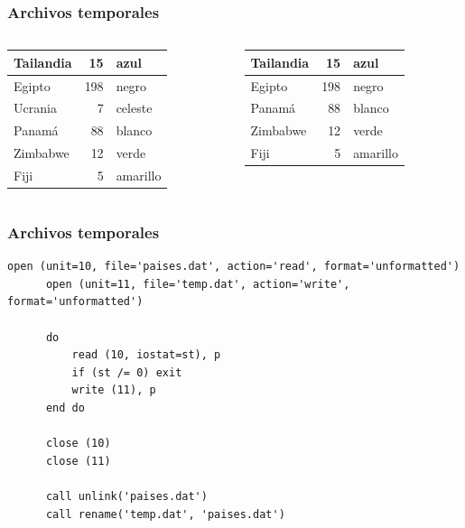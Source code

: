 \documentclass[12pt]{beamer}
\begin{document}
  \begin{frame}
    \frametitle{Archivos temporales}
    \begin{columns}[t]
        \vspace{2ex}
        \begin{tabular}{|l|r|l|}\hline
          Tailandia &  15 & azul     \\\hline
          Egipto    & 198 & negro    \\\hline
          Ucrania   &   7 & celeste  \\\hline
          Panamá    &  88 & blanco   \\\hline
          Zimbabwe  &  12 & verde    \\\hline
          Fiji      &   5 & amarillo \\\hline
        \end{tabular}
        \pause
        \begin{tabular}{|l|r|l|}\hline
          Tailandia &  15 & azul    \\\hline
          Egipto    & 198 & negro   \\\hline
          Panamá    &  88 & blanco  \\\hline
          Zimbabwe  &  12 & verde    \\\hline
          Fiji      &   5 & amarillo \\\hline
        \end{tabular}
    \end{columns}
  \end{frame}

  \begin{frame}[fragile]
    \frametitle{Archivos temporales}
    \begin{lstlisting}[gobble=6]
      open (unit=10, file='paises.dat', action='read', format='unformatted')
      open (unit=11, file='temp.dat', action='write', format='unformatted')

      do
          read (10, iostat=st), p
          if (st /= 0) exit
          write (11), p
      end do

      close (10)
      close (11)

      call unlink('paises.dat')
      call rename('temp.dat', 'paises.dat')
    \end{lstlisting}

\end{frame}
\end{document}
